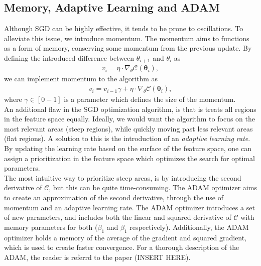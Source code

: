 \subsection{Memory, Adaptive Learning and ADAM}
Although \ac{SGD} can be highly effective, it tends to be prone to oscillations. To alleviate this issue, we introduce momentum. The momentum aims to functions as a form of 
memory, conserving some momentum from the previous update. By defining the introduced difference between $\theta_{i+1}$ and $\theta_{i}$ as 
\begin{align}
    v_i = \eta \cdot \nabla_\theta \mathcal{C}\left(\boldsymbol{\theta}_i\right),
\end{align}
we can implement momentum to the algorithm as 
\begin{align}
    v_i = v_{i-1} \gamma +\eta \cdot \nabla_\theta \mathcal{C}\left(\boldsymbol{\theta}_i\right),
\end{align}
where $\gamma \in [0-1]$ is a parameter which defines the size of the momentum.
\\
An additional flaw in the \ac{SGD} optimization algorithm, is that is treats all regions in the feature space equally. Ideally, we would want the algorithm to focus 
on the most relevant areas (steep regions), while quickly moving past less relevant areas (flat regions). A solution to this is the introduction of an \emph{adaptive learning rate}.
By updating the learning rate based on the surface of the feature space, one can assign a prioritization in the feature space which optimizes the search for optimal parameters.
\\
The most intuitive way to prioritize steep areas, is by introducing the second derivative of $\mathcal{C}$, but this can be quite time-consuming. The \ac{ADAM} optimizer aims to 
create an approximation of the second derivative, through the use of momentum and an adaptive learning rate. The \ac{ADAM} optimizer introduces a set of new parameters, and includes both the 
linear and squared derivative of $\mathcal{C}$ with memory parameters for both ($\beta_1$ and $\beta_1$ respectively). Additionally, the \ac{ADAM} optimizer holds a memory of the average of the 
gradient and squared gradient, which is used to create faster convergence. For a thorough description of the \ac{ADAM}, the reader is referrd to the paper 
(INSERT HERE).